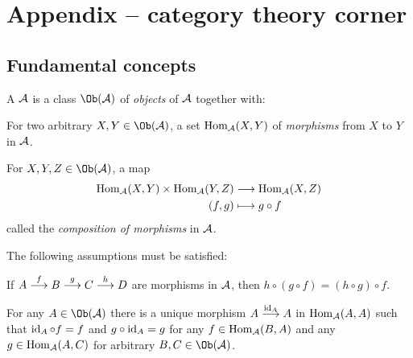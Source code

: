 \documentclass[a4paper,parskip=half,numbers=enddot, DIV=12]{scrreprt}
\begin{document}
    
    
     
    
    
    
    \appendix
    \chapter{Appendix -- category theory corner}
\section{Fundamental concepts}
\begin{defi}[Category]
	A  $\mathcal{A}$ is a class $\Ob(\Aa)$ of \emph{objects} of $\mathcal{A}$ together with:
	\begin{alphanumerate}
	    \item 
	        For two arbitrary $X,Y\in \Ob(\Aa)$, a set $\operatorname{Hom}_{\mathcal{A}}(X,Y)$ of \emph{morphisms} from $X$ to $Y$ in $\mathcal{A}$.
	    \item 
	        For $X,Y,Z\in\Ob(\Aa)$, a map 
	        \begin{align*}
	            \operatorname{Hom}_{\mathcal{A}}(X,Y)\times \operatorname{Hom}_{\mathcal{A}}(Y,Z) &\longrightarrow \operatorname{Hom}_{\mathcal{A}}(X,Z)\\
	            (f,g) &\longmapsto g\circ f
	        \end{align*}
	        called the \emph{composition of morphisms} in $\mathcal{A}$.
	\end{alphanumerate}
	The following assumptions must be satisfied:
	\begin{rmnumerate}
	    \item
	        If $A\morphism[f] B \morphism[g] C\morphism[h] D$ are morphisms in $\mathcal{A}$, then $h\circ(g\circ f) = (h\circ g)\circ f$.
	    \item
	        For any $A\in\Ob(\Aa)$ there is a unique morphism $A\morphism[\id_A] A$ in $\operatorname{Hom}_{\mathcal{A}}(A,A)$ such that $\operatorname{id}_A \circ f = f$ and $g\circ \operatorname{id}_A = g$ for any $f\in \operatorname{Hom}_{\mathcal{A}}(B,A)$ and any $g\in \operatorname{Hom}_{\mathcal{A}}(A,C)$ for arbitrary $B,C\in \Ob(\Aa)$.
	\end{rmnumerate}
\end{defi}
\end{document}
